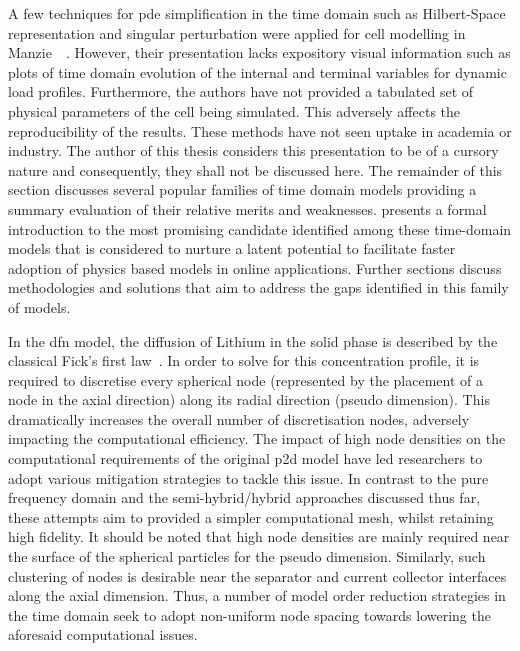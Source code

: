 A  few techniques  for  \gls{pde}  simplification in  the  time  domain such  as
Hilbert-Space  representation and  singular perturbation  were applied  for cell
modelling in  Manzie~\etal~\cite{Manzie2015}. However, their  presentation lacks
expository visual  information such  as plots  of time  domain evolution  of the
internal  and terminal  variables for  dynamic load  profiles. Furthermore,  the
authors have  not provided a  tabulated set of  physical parameters of  the cell
being  simulated. This  adversely affects  the reproducibility  of the  results.
These methods have not  seen uptake in academia or industry.  The author of this
thesis considers this  presentation to be of a cursory  nature and consequently,
they  shall not  be  discussed here.  The remainder  of  this section  discusses
several popular families of time domain models providing a summary evaluation of
their  relative merits  and  weaknesses.   presents a  formal
introduction to the most promising  candidate identified among these time-domain
models that  is considered to  nurture a  latent potential to  facilitate faster
adoption  of  physics based  models  in  online applications.  Further  sections
discuss methodologies and  solutions that aim to address the  gaps identified in
this family of models. 


In the \gls{dfn} model, the diffusion of Lithium in the solid phase is described
by the classical  Fick's first law~\cite{Fick1995}. In order to  solve for this
concentration  profile,  it  is  required to  discretise  every  spherical  node
(represented by the placement of a node in the axial direction) along its radial
direction (pseudo dimension). This dramatically  increases the overall number of
discretisation  nodes, adversely  impacting  the  computational efficiency.  The
impact of high node densities on  the computational requirements of the original
\gls{p2d}  model have  led researchers  to adopt  various mitigation  strategies
to  tackle  this  issue. In  contrast  to  the  pure  frequency domain  and  the
semi-hybrid/hybrid approaches discussed thus far, these attempts aim to provided
a simpler computational mesh, whilst retaining high fidelity. It should be noted
that high node  densities are mainly required near the  surface of the spherical
particles for the pseudo   dimension. Similarly, such clustering
of nodes is desirable near the  separator and current collector interfaces along
the axial  dimension.
Thus, a number  of model order reduction  strategies in the time  domain seek to
adopt  non-uniform node  spacing  towards lowering  the aforesaid  computational
issues.


